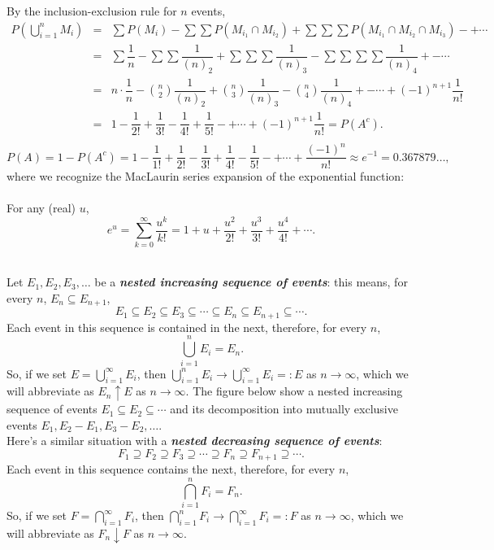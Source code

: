 \documentclass[12pt]{article}
\begin{document}
\noindent By the inclusion-exclusion rule for $n$ events,
\begin{eqnarray*}
P\left(\bigcup_{i=1}^nM_i\right)
&=& \sum P(M_i) - \sum\sum P(M_{i_1}\cap M_{i_2}) + \sum\sum\sum P(M_{i_1}\cap M_{i_2}\cap M_{i_3}) - + \cdots\\
&=& \sum \dfrac 1{n} - \sum\sum \dfrac 1{(n)_2} + \sum\sum\sum \dfrac 1{(n)_3} - \sum\sum\sum\sum \dfrac 1{(n)_4 } + - \cdots\\
&=& n\cdot \dfrac 1n - {n\choose 2}\dfrac 1{(n)_2} + {n\choose 3}\dfrac 1{(n)_3} - {n\choose 4}\dfrac 1{(n)_4} + - \cdots + (-1)^{n+1}\dfrac 1{n!} \\
&=& 1 - \dfrac 1{2!} + \dfrac 1{3!} - \dfrac 1{4!} + \dfrac 1{5!} - + \cdots + (-1)^{n+1}\dfrac 1{n!} = P(A^c).\\
\end{eqnarray*}
$$P(A) = 1-P(A^c) = 1 - \dfrac 1{1!} + \dfrac 1{2!} - \dfrac 1{3!} + \dfrac 1{4!} - \dfrac 1{5!} - + \cdots + \dfrac {(-1)^n}{n!} \approx e^{-1} =0.367879\dots,$$
where we recognize the MacLaurin series expansion of the exponential function:\\

\label{d:maclaurinseries1}\\
For any (real) $u$,
$$e^u = \sum_{k=0}^{\infty} \frac {u^k}{k!} = 1 + u + \frac {u^2}{2!} + \frac {u^3}{3!} + \frac {u^4}{4!} + \cdots.$$

\newpage

\label{s:continuityprobmeas}\\

\noindent Let  $E_1,E_2,E_3,\dots$ be a {\bf \em nested increasing sequence of events}\label{nestedincreasing}: this means, for every $n$, $E_n\subseteq E_{n+1}$,
$$E_1\subseteq E_2\subseteq E_3\subseteq \cdots \subseteq E_n\subseteq E_{n+1} \subseteq \cdots.$$
Each event in this sequence is contained in the next, therefore, for every $n$,
$$\bigcup_{i=1}^nE_i = E_n.$$
So, if we set $E = \bigcup_{i=1}^{\infty}E_i$, then $\bigcup_{i=1}^nE_i\to \bigcup_{i=1}^{\infty}E_i=:E$ as $n\to \infty$, which we will abbreviate as $E_n\uparrow E$ as $n\to \infty$.  The figure below show a nested increasing sequence of events $E_1\subseteq E_2\subseteq \cdots$ and its decomposition into mutually exclusive events
$E_1, E_2-E_1, E_3-E_2,\dots$.\\

\noindent Here's a similar situation with a {\bf \em nested decreasing sequence of events}\label{nesteddecreasing}:
$$F_1\supseteq F_2\supseteq F_3\supseteq \cdots\supseteq F_n\supseteq F_{n+1}\supseteq \cdots.$$
Each event in this sequence contains the next, therefore, for every $n$,
$$\bigcap_{i=1}^nF_i = F_n.$$
So, if we set $F = \bigcap_{i=1}^{\infty}F_i$, then $\bigcap_{i=1}^nF_i\to \bigcap_{i=1}^{\infty}F_i=:F$ as $n\to\infty$, which we will abbreviate as $F_n\downarrow F$ as $n\to\infty$.
\end{document}

